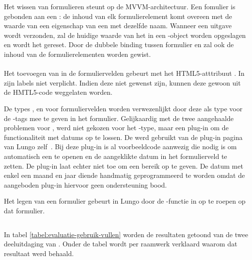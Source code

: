 Het wissen van formulieren steunt op de MVVM-architectuur.
 Een fomulier is gebonden aan een :  de inhoud van elk formulierelement komt overeen met de waarde van een eigenschap van een  met dezelfde naam.
 Wanneer een uitgave wordt verzonden, zal de huidige waarde van het  in een \js-object worden opgeslagen en wordt het  gereset.
 Door de dubbele binding tussen formulier en  zal ook de inhoud van de formulierelementen worden gewist.
 
 
\paragraph{\lungo} 
Het toevoegen van  in de formuliervelden gebeurt met het HTML5-atttribuut .
In \lungo{} zijn labels niet verplicht.
Indien deze niet gewenst zijn, kunnen deze gewoon uit de HMTL5-code weggelaten worden.

De types ,  en  voor formuliervelden worden verwezenlijkt door deze als type voor de -tags mee te geven in het formulier.
Gelijkaardig met de twee aangehaalde problemen voor \jqm{}, werd niet gekozen voor het -type, maar een plug-in om de functionaliteit met datums op te lossen.
De  werd gebruikt van de plug-in pagina van Lungo zelf~\cite{TapQuo2013b}.
Bij deze plug-in is al voorbeeldcode aanwezig die nodig is om automatisch een  te openen en de aangeklikte datum in het formulierveld te zetten.
De plug-in laat echter niet toe om een bereik op te geven.
De datum met enkel een maand en jaar diende handmatig geprogrammeerd te worden omdat de aangeboden plug-in hiervoor geen ondersteuning bood.

Het legen van een formulier gebeurt in Lungo door de -functie in \js{} op te roepen op dat formulier.


\subsection{}
\label{sec:evaluatie-gebruik-vullen}

In tabel \ref{tabel:evaluatie-gebruik-vullen} worden de resultaten getoond van de twee deeluitdaging van .
Onder de tabel wordt per raamwerk verklaard waarom dat resultaat werd behaald.

